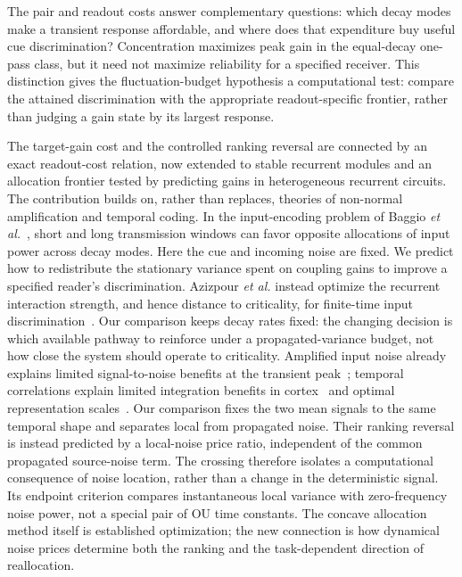 \documentclass[aps,10pt,onecolumn,superscriptaddress,nofootinbib,longbibliography,
  amsmath,amssymb,floatfix]{revtex4-2}
\begin{document}
The pair and readout costs answer complementary questions: which
decay modes make a transient response affordable, and where does
that expenditure buy useful cue discrimination? Concentration
maximizes peak gain in the equal-decay one-pass class, but it need
not maximize reliability for a specified receiver. This distinction
gives the fluctuation-budget hypothesis a computational test: compare
the attained discrimination with the appropriate readout-specific
frontier, rather than judging a gain state by its largest response.

The target-gain cost and the controlled ranking reversal are
connected by an exact readout-cost relation, now extended to
stable recurrent modules and an allocation frontier tested by
predicting gains in heterogeneous recurrent circuits.
The contribution builds on, rather than replaces, theories of
non-normal amplification and temporal coding. In the input-encoding
problem of Baggio \emph{et al.}~\cite{baggio2020communication},
short and long transmission windows can favor opposite allocations
of input power across decay modes. Here the cue and incoming noise
are fixed. We predict how to redistribute the stationary variance
spent on coupling gains to improve a specified reader's discrimination.
Azizpour \emph{et al.} instead optimize the recurrent interaction
strength, and hence distance to criticality, for finite-time
input discrimination~\cite{azizpour2026finite}. Our comparison
keeps decay rates fixed: the changing decision is which available
pathway to reinforce under a propagated-variance budget, not how
close the system should operate to criticality.
Amplified input
noise already explains limited signal-to-noise benefits at the
transient peak~\cite{bondanelli2020}; temporal correlations explain
limited integration benefits in cortex~\cite{goris2018integration}
and optimal representation scales~\cite{ahmed2026temporal}.
Our comparison fixes the two mean signals to the same temporal
shape and separates local from propagated noise.
Their ranking reversal is instead predicted by a local-noise
price ratio, independent of the common propagated source-noise
term. The crossing therefore isolates a computational consequence
of noise location, rather than a change in the deterministic signal.
Its endpoint criterion compares instantaneous local variance with
zero-frequency noise power, not a special pair of OU time constants.
The concave allocation method itself is established optimization;
the new connection is how dynamical noise prices determine both
the ranking and the task-dependent direction of reallocation.
\end{document}
